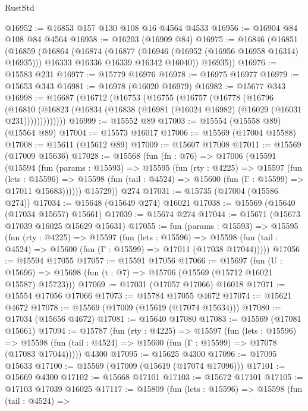 \begin{lexlean}{RustStd}
\begin{coremodule}
@16952 := @16853 @157 @130 @108 @16 @4564 @4533
@16956 := @16904 @84 @108 @84 @4564
@16958 := @16203 (@16909 @84)
@16975 := @16846
    (@16851
      (@16859
        (@16864
          (@16874
            (@16877 (@16946 (@16952 (@16956 @16958 @16314) @16935)))
            @16333
            @16336
            @16339
            @16342
            @16040))
        @16935))
@16976 := @15583 @231
@16977 := @15779 @16976
@16978 := @16975 @16977
@16979 := @15653 @343
@16981 := @16978 (@16020 @16979)
@16982 := @15677 @343
@16998 := @16687
    (@16712
      (@16753
        (@16755
          (@16757
            (@16778
              (@16796
                (@16810
                  (@16823 (@16834 (@16838 (@16981 (@16024 @16982) (@16029 (@16031 @231)))))))))))))
@16999 := @15552 @89
@17003 := @15554 (@15558 @89) (@15564 @89)
@17004 := @15573 @16017
@17006 := @15569 (@17004 @15588)
@17008 := @15611 (@15612 @89)
@17009 := @15607 @17008
@17011 := @15569 (@17009 @15636)
@17028 := @15568
    (fun (fn : @76) =>
    @17006
      (@15591
        (@15594
          (fun (params : @15593) =>
          @15595
            (fun (rty : @4225) =>
            @15597
              (fun (lets : @15596) =>
              @15598 (fun (tail : @4524) => @15600 (fun (Γ : @15599) => @17011 @15683))))))
        @15729))
    @274
@17031 := @15735 (@17004 (@15586 @274))
@17034 := @15648 (@15649 @274) @16021
@17038 := @15569 (@15640 (@17034 @15657) @15661)
@17039 := @15674 @274
@17044 := @15671 (@15673 @17039 @16025 @15629 @15631)
@17055 := fun (params : @15593) =>
  @15595
    (fun (rty : @4225) =>
    @15597
      (fun (lets : @15596) =>
      @15598 (fun (tail : @4524) => @15600 (fun (Γ : @15599) => @17011 (@17038 @17044)))))
@17056 := @15594 @17055
@17057 := @15591 @17056
@17066 := @15697
    (fun (U : @15696) => @15698 (fun (t : @7) => @15706 (@15569 (@15712 @16021 @15587) @15723)))
@17069 := @17031 (@17057 @17066) @16018
@17071 := @15554 @17056 @17066
@17073 := @15784 @17055 @4672
@17074 := @15621 @4672
@17078 := @15569 (@17009 (@15619 (@17074 @15634)))
@17080 := @17034 (@15656 @4672)
@17081 := @15640 @17080
@17083 := @15569 (@17081 @15661)
@17094 := @15787
    (fun (rty : @4225) =>
    @15597
      (fun (lets : @15596) =>
      @15598 (fun (tail : @4524) => @15600 (fun (Γ : @15599) => @17078 (@17083 @17044)))))
    @4300
@17095 := @15625 @4300
@17096 := @17095 @15633
@17100 := @15569 (@17009 (@15619 (@17074 @17096)))
@17101 := @15669 @4300
@17102 := @15668 @17101
@17103 := @15672 @17101
@17105 := @17103 @17039 @16025
@17117 := @15809
    (fun (lets : @15596) =>
    @15598
      (fun (tail : @4524) =>

\end{coremodule}
\end{lexlean}
